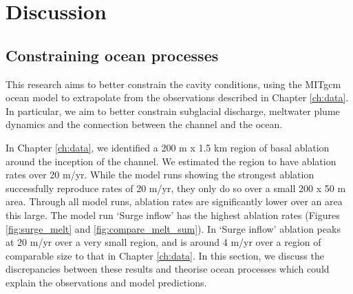 \section{Discussion} \label{ocean_discuss}



\subsection{Constraining ocean processes}

This research aims to better constrain the cavity conditions, using the MITgcm ocean model to extrapolate from the observations described in Chapter \ref{ch:data}. In particular, we aim to better constrain subglacial discharge, meltwater plume dynamics and the connection between the channel and the ocean.

In Chapter \ref{ch:data}, we identified a 200 m x 1.5 km region of basal ablation around the inception of the channel. We estimated the region to have ablation rates over 20 m/yr. 
While the model runs showing the strongest ablation successfully reproduce rates of 20 m/yr, they only do so over a small 200 x 50 m area. Through all model runs, ablation rates are significantly lower over an area this large. The model run `Surge inflow' has the highest ablation rates (Figures \ref{fig:surge_melt} and \ref{fig:compare_melt_sum}). In `Surge inflow' ablation peaks at 20 m/yr over a very small region, and is around 4 m/yr over a region of comparable size to that in Chapter \ref{ch:data}. In this section, we discuss the discrepancies between these results and theorise ocean processes which could explain the observations and model predictions.

